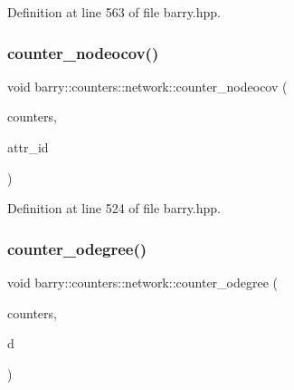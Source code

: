 Definition at line 563 of file barry.\+hpp.

\mbox{\label{namespacebarry_1_1counters_1_1network_a2804cd2dba633fdccc7a1ca6a15bdf47}} 
\subsubsection{\texorpdfstring{counter\+\_\+nodeocov()}{counter\_nodeocov()}}
{\footnotesize\ttfamily void barry\+::counters\+::network\+::counter\+\_\+nodeocov (\begin{DoxyParamCaption}\item[{\hyperlink{namespacebarry_1_1counters_1_1network_a3b3c590303d47840d1967372ae495d95}{Net\+Counter\+Vector} $\ast$}]{counters,  }\item[{\hyperlink{namespacebarry_a11dfc53ddb4672278319aa04f1e09a6c}{uint}}]{attr\+\_\+id }\end{DoxyParamCaption})\hspace{0.3cm}{\ttfamily [inline]}}



Definition at line 524 of file barry.\+hpp.

\mbox{\label{namespacebarry_1_1counters_1_1network_af679a51acdd35805c7c40748af65c0f4}} 
\subsubsection{\texorpdfstring{counter\+\_\+odegree()}{counter\_odegree()}}
{\footnotesize\ttfamily void barry\+::counters\+::network\+::counter\+\_\+odegree (\begin{DoxyParamCaption}\item[{\hyperlink{namespacebarry_1_1counters_1_1network_a3b3c590303d47840d1967372ae495d95}{Net\+Counter\+Vector} $\ast$}]{counters,  }\item[{std\+::vector$<$ \hyperlink{namespacebarry_a11dfc53ddb4672278319aa04f1e09a6c}{uint} $>$}]{d }\end{DoxyParamCaption})\hspace{0.3cm}{\ttfamily [inline]}}



